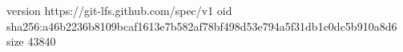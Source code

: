 version https://git-lfs.github.com/spec/v1
oid sha256:a46b2236b8109bcaf1613e7b582af78bf498d53e794a5f31db1c0dc5b910a8d6
size 43840

